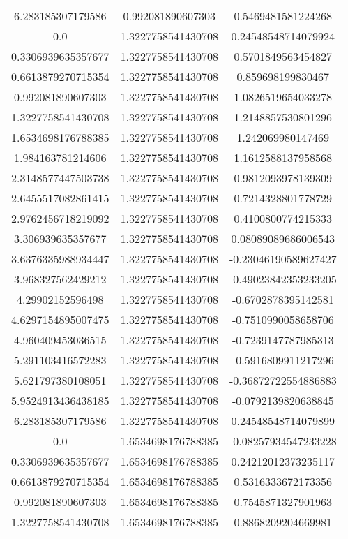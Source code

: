 \begin{table}
\begin{tabular}{ccc}
6.283185307179586 & 0.992081890607303 & 0.5469481581224268 \\
0.0 & 1.3227758541430708 & 0.24548548714079924 \\
0.3306939635357677 & 1.3227758541430708 & 0.5701849563454827 \\
0.6613879270715354 & 1.3227758541430708 & 0.859698199830467 \\
0.992081890607303 & 1.3227758541430708 & 1.0826519654033278 \\
1.3227758541430708 & 1.3227758541430708 & 1.2148857530801296 \\
1.6534698176788385 & 1.3227758541430708 & 1.242069980147469 \\
1.984163781214606 & 1.3227758541430708 & 1.1612588137958568 \\
2.3148577447503738 & 1.3227758541430708 & 0.9812093978139309 \\
2.6455517082861415 & 1.3227758541430708 & 0.7214328801778729 \\
2.9762456718219092 & 1.3227758541430708 & 0.4100800774215333 \\
3.306939635357677 & 1.3227758541430708 & 0.08089089686006543 \\
3.6376335988934447 & 1.3227758541430708 & -0.23046190589627427 \\
3.968327562429212 & 1.3227758541430708 & -0.49023842353233205 \\
4.29902152596498 & 1.3227758541430708 & -0.6702878395142581 \\
4.6297154895007475 & 1.3227758541430708 & -0.7510990058658706 \\
4.960409453036515 & 1.3227758541430708 & -0.7239147787985313 \\
5.291103416572283 & 1.3227758541430708 & -0.5916809911217296 \\
5.621797380108051 & 1.3227758541430708 & -0.36872722554886883 \\
5.9524913436438185 & 1.3227758541430708 & -0.0792139820638845 \\
6.283185307179586 & 1.3227758541430708 & 0.24548548714079899 \\
0.0 & 1.6534698176788385 & -0.08257934547233228 \\
0.3306939635357677 & 1.6534698176788385 & 0.24212012373235117 \\
0.6613879270715354 & 1.6534698176788385 & 0.5316333672173356 \\
0.992081890607303 & 1.6534698176788385 & 0.7545871327901963 \\
1.3227758541430708 & 1.6534698176788385 & 0.8868209204669981 \\

\end{tabular}
\end{table}
